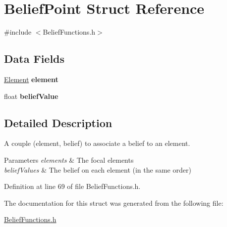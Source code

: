 \hypertarget{struct_belief_point}{
\section{BeliefPoint Struct Reference}
\label{struct_belief_point}
}


{\ttfamily \#include $<$BeliefFunctions.h$>$}

\subsection*{Data Fields}
\begin{DoxyCompactItemize}
\item 
\hypertarget{struct_belief_point_ae6bcc69b531dedf3a1d9142f46bcbb77}{
\hyperlink{struct_element}{Element} {\bfseries element}}
\label{struct_belief_point_ae6bcc69b531dedf3a1d9142f46bcbb77}

\item 
\hypertarget{struct_belief_point_a59bb288073cdc2754b6d0ebc93b478d0}{
float {\bfseries beliefValue}}
\label{struct_belief_point_a59bb288073cdc2754b6d0ebc93b478d0}

\end{DoxyCompactItemize}


\subsection{Detailed Description}
A couple (element, belief) to associate a belief to an element. 
\begin{DoxyParams}{Parameters}
{\em elements} & The focal elements \\
\hline
{\em beliefValues} & The belief on each element (in the same order) \\
\hline
\end{DoxyParams}


Definition at line 69 of file BeliefFunctions.h.



The documentation for this struct was generated from the following file:\begin{DoxyCompactItemize}
\item 
\hyperlink{_belief_functions_8h}{BeliefFunctions.h}\end{DoxyCompactItemize}
